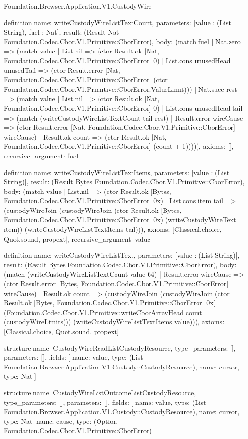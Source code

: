 \begin{lexlean}{Foundation.Browser.Application.V1.CustodyWire}
\begin{semanticmodule}
definition{
  name: writeCustodyWireListTextCount,
  parameters: [value : (List String), fuel : Nat],
  result: (Result Nat Foundation.Codec.Cbor.V1.Primitive::CborError),
  body: (match fuel
    | Nat.zero => (match value
      | List.nil => (ctor Result.ok [Nat, Foundation.Codec.Cbor.V1.Primitive::CborError] 0)
      | List.cons unusedHead unusedTail => (ctor Result.error [Nat, Foundation.Codec.Cbor.V1.Primitive::CborError] (ctor Foundation.Codec.Cbor.V1.Primitive::CborError.ValueLimit)))
    | Nat.succ rest => (match value
      | List.nil => (ctor Result.ok [Nat, Foundation.Codec.Cbor.V1.Primitive::CborError] 0)
      | List.cons unusedHead tail => (match (writeCustodyWireListTextCount tail rest)
        | Result.error wireCause => (ctor Result.error [Nat, Foundation.Codec.Cbor.V1.Primitive::CborError] wireCause)
        | Result.ok count => (ctor Result.ok [Nat, Foundation.Codec.Cbor.V1.Primitive::CborError] (count + 1))))),
  axioms: [],
  recursive_argument: fuel
}

definition{
  name: writeCustodyWireListTextItems,
  parameters: [value : (List String)],
  result: (Result Bytes Foundation.Codec.Cbor.V1.Primitive::CborError),
  body: (match value
    | List.nil => (ctor Result.ok [Bytes, Foundation.Codec.Cbor.V1.Primitive::CborError] 0x)
    | List.cons item tail => (custodyWireJoin (custodyWireJoin (ctor Result.ok [Bytes, Foundation.Codec.Cbor.V1.Primitive::CborError] 0x) (writeCustodyWireText item)) (writeCustodyWireListTextItems tail))),
  axioms: [Classical.choice, Quot.sound, propext],
  recursive_argument: value
}

definition{
  name: writeCustodyWireListText,
  parameters: [value : (List String)],
  result: (Result Bytes Foundation.Codec.Cbor.V1.Primitive::CborError),
  body: (match (writeCustodyWireListTextCount value 64)
    | Result.error wireCause => (ctor Result.error [Bytes, Foundation.Codec.Cbor.V1.Primitive::CborError] wireCause)
    | Result.ok count => (custodyWireJoin (custodyWireJoin (ctor Result.ok [Bytes, Foundation.Codec.Cbor.V1.Primitive::CborError] 0x) (Foundation.Codec.Cbor.V1.Primitive::writeCborArrayHead count (custodyWireLimits))) (writeCustodyWireListTextItems value))),
  axioms: [Classical.choice, Quot.sound, propext]
}

structure{
  name: CustodyWireReadListCustodyResource,
  type_parameters: [],
  parameters: [],
  fields: [
    {name: value, type: (List Foundation.Browser.Application.V1.Custody::CustodyResource)},
    {name: cursor, type: Nat}
  ]
}

structure{
  name: CustodyWireListOutcomeListCustodyResource,
  type_parameters: [],
  parameters: [],
  fields: [
    {name: value, type: (List Foundation.Browser.Application.V1.Custody::CustodyResource)},
    {name: cursor, type: Nat},
    {name: cause, type: (Option Foundation.Codec.Cbor.V1.Primitive::CborError)}
  ]
}


\end{semanticmodule}
\end{lexlean}
